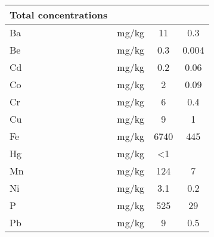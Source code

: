 \begin{table}
\begin{tabular}{lccc}
\textbf{Total concentrations} & \multicolumn{1}{l}{\textbf{}} & \multicolumn{1}{l}{\textbf{}} & \multicolumn{1}{l}{\textbf{}} \\ \hline \addlinespace
Ba                            & mg/kg                         & 11                         & 0.3                           \\
Be                            & mg/kg                         & 0.3                         & 0.004                         \\
Cd                            & mg/kg                         & 0.2                          & 0.06                          \\
Co                            & mg/kg                         & 2                         & 0.09                          \\
Cr                            & mg/kg                         & 6                          & 0.4                           \\
Cu                            & mg/kg                         & 9                          & 1                          \\
Fe                            & mg/kg                         & 6740                       & 445                         \\
Hg                            & mg/kg                      & \textless{}1                  &                               \\
Mn                            & mg/kg                      & 124                        & 7                          \\
Ni                            & mg/kg                      & 3.1                          & 0.2                           \\
P                             & mg/kg                      & 525                       & 29                          \\
Pb                            & mg/kg                      & 9                          & 0.5       \\ \bottomrule          
\end{tabular}
\end{table}